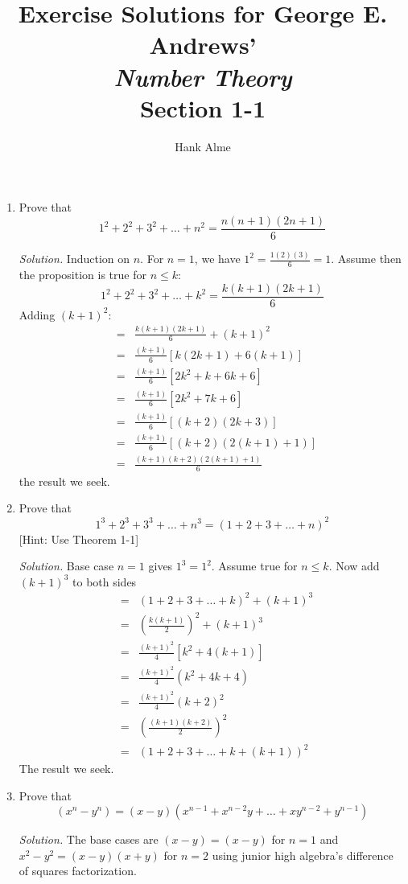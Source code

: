 \documentclass[12pt]{article}
\title{Exercise Solutions for George E. Andrews' \\
  {\em Number Theory} \\
Section 1-1}
\author{Hank Alme}
\newcommand\sol[1]{\begin{mdframed}
\emph{Solution.} #1
\end{mdframed}}
\begin{document}
\maketitle

\begin{enumerate}
\item Prove that
  \[
  1^2 + 2^2 + 3^2 + \ldots + n^2 = \frac{n(n+1)(2n+1)}{6}
  \]

  \sol{Induction on $n$. For $n =1$, we have $1^2 = \frac{1(2)(3)}{6} = 1$. Assume then the proposition is true for $n \le k$:
    \[
1^2 + 2^2 + 3^2 + \ldots + k^2 = \frac{k(k+1)(2k+1)}{6}
\]
Adding $(k+1)^2$:
\begin{eqnarray*}
  &=&\frac{k(k+1)(2k+1)}{6} + (k+1)^2 \\
  &=&\frac{(k+1)}{6} [ k(2k+1) + 6(k+1) ] \\
  &=&\frac{(k+1)}{6} [ 2k^2+k + 6k+6 ]\\
  &=&\frac{(k+1)}{6} [ 2k^2+7k +6 ]\\
  &=&\frac{(k+1)}{6} [ (k+2)(2k+3) ]\\
  &=&\frac{(k+1)}{6} [ (k+2)(2(k+1)+1) ]\\
  &=&\frac{(k+1)(k+2)(2(k+1)+1)}{6}  
\end{eqnarray*}
the result we seek.
}

\item Prove that
  \[
  1^3 + 2^3 + 3^3 + \ldots + n^3 = (1+2+3+\ldots+n)^2
  \]
    [Hint: Use Theorem 1-1]

    \sol{Base case $n=1$ gives $1^3 = 1^2$. Assume true for $n \le
      k$. Now add $(k+1)^3$ to both sides
      \begin{eqnarray*}
        &=& (1+2+3+\ldots+k)^2 + (k+1)^3 \\
        &=& \left (\frac{k(k+1)}{2} \right)^2 + (k+1)^3  \\
        &=& \frac{(k+1)^2}{4} [k^2 + 4(k+1)] \\
        &=& \frac{(k+1)^2}{4} (k^2 + 4k+4) \\
        &=& \frac{(k+1)^2}{4} (k+2)^2 \\
        &=& \left (\frac{(k+1)(k+2)}{2} \right)^2 \\
        &=& (1+2+3+\ldots+k+(k+1))^2 
      \end{eqnarray*}
      The result we seek.}


  \item Prove that
    \[
    (x^n - y^n) = (x-y)(x^{n-1} + x^{n-2}y + \ldots +xy^{n-2}+y^{n-1})
    \]

    \sol{
      The base cases are $(x-y) = (x-y)$ for $n=1$ and $x^2 - y^2 = (x-y)(x+y)$ for $n=2$ using junior high algebra's difference of squares factorization.
      
}
\end{enumerate}
\end{document}
